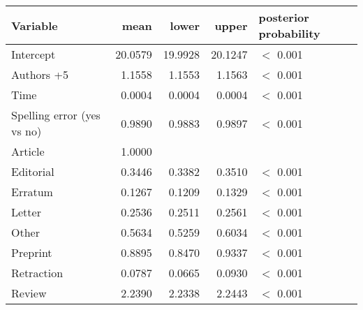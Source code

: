 \begin{table}[ht]
\centering
\begin{tabular}{lrrrl}
 Variable & mean & lower & upper & posterior probability \\ 
  \hline
Intercept & 20.0579 & 19.9928 & 20.1247 & $<$ 0.001 \\ 
  Authors +5 & 1.1558 & 1.1553 & 1.1563 & $<$ 0.001 \\ 
  Time & 0.0004 & 0.0004 & 0.0004 & $<$ 0.001 \\ 
  Spelling error (yes vs no) & 0.9890 & 0.9883 & 0.9897 & $<$ 0.001 \\ 
  Article & 1.0000 &  &  &  \\ 
  Editorial & 0.3446 & 0.3382 & 0.3510 & $<$ 0.001 \\ 
  Erratum & 0.1267 & 0.1209 & 0.1329 & $<$ 0.001 \\ 
  Letter & 0.2536 & 0.2511 & 0.2561 & $<$ 0.001 \\ 
  Other & 0.5634 & 0.5259 & 0.6034 & $<$ 0.001 \\ 
  Preprint & 0.8895 & 0.8470 & 0.9337 & $<$ 0.001 \\ 
  Retraction & 0.0787 & 0.0665 & 0.0930 & $<$ 0.001 \\ 
  Review & 2.2390 & 2.2338 & 2.2443 & $<$ 0.001 \\ 
  \end{tabular}
\end{table}
